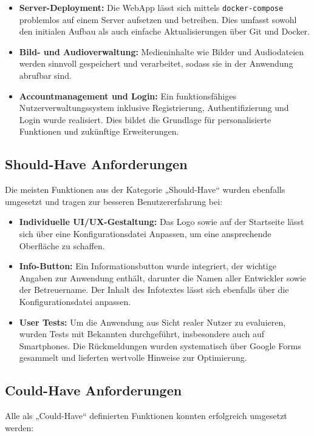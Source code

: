 \documentclass[oneside]{ausarbeitung}
\begin{document}
\begin{itemize}
  \item \textbf{Server-Deployment:} Die WebApp lässt sich mittels \texttt{docker-compose} problemlos auf einem Server aufsetzen und betreiben.  
  Dies umfasst sowohl den initialen Aufbau als auch einfache Aktualisierungen über Git und Docker.  
  \item \textbf{Bild- und Audioverwaltung:} Medieninhalte wie Bilder und Audiodateien werden sinnvoll gespeichert und verarbeitet, sodass sie in der Anwendung abrufbar sind.  
  \item \textbf{Accountmanagement und Login:} Ein funktionsfähiges Nutzerverwaltungssystem inklusive Registrierung, Authentifizierung und Login wurde realisiert.  
  Dies bildet die Grundlage für personalisierte Funktionen und zukünftige Erweiterungen.  
\end{itemize}

\subsection{Should-Have Anforderungen}

Die meisten Funktionen aus der Kategorie „Should-Have“ wurden ebenfalls umgesetzt und tragen zur besseren Benutzererfahrung bei:  

\begin{itemize}
  \item \textbf{Individuelle UI/UX-Gestaltung:} Das Logo sowie auf der Startseite lässt sich über eine Konfigurationsdatei Anpassen, um eine ansprechende Oberfläche zu schaffen.  
  \item \textbf{Info-Button:} Ein Informationsbutton wurde integriert, der wichtige Angaben zur Anwendung enthält, darunter die Namen aller Entwickler sowie der Betreuername. Der Inhalt des Infotextes lässt sich ebenfalls über die Konfigurationsdatei anpassen.
  \item \textbf{User Tests:} Um die Anwendung aus Sicht realer Nutzer zu evaluieren, wurden Tests mit Bekannten durchgeführt, insbesondere auch auf Smartphones. Die Rückmeldungen wurden systematisch über Google Forms gesammelt und lieferten wertvolle Hinweise zur Optimierung.  
\end{itemize}

\subsection{Could-Have Anforderungen}

Alle als „Could-Have“ definierten Funktionen konnten erfolgreich umgesetzt werden:  
\end{document}
